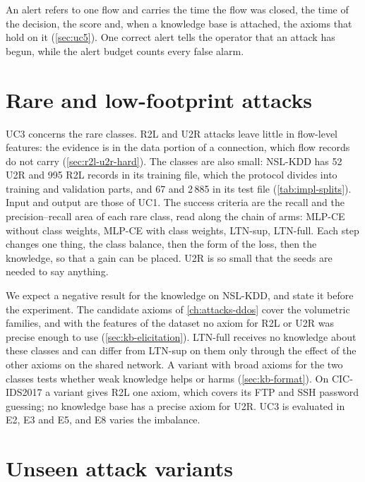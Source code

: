 An alert refers to one flow and carries the time the flow was closed, the time of
the decision, the score and, when a knowledge base is attached, the axioms that
hold on it (\cref{sec:uc5}). One correct alert tells the operator that an attack
has begun, while the alert budget counts every false alarm.

\section{Rare and low-footprint attacks}
\label{sec:uc3}

UC3 concerns the rare classes. R2L and U2R attacks leave little in flow-level features: the evidence is in the
data portion of a connection, which flow records do not carry
(\cref{sec:r2l-u2r-hard}). The classes are also small: NSL-KDD has 52 U2R and 995
R2L records in its training file, which the protocol divides into training and
validation parts, and 67 and 2\,885 in its test file (\cref{tab:impl-splits}).
Input and output are those of UC1. The success criteria are the recall and the
precision--recall area of each rare class, read along the chain of arms: MLP-CE
without class weights, MLP-CE with class weights, LTN-sup, LTN-full. Each step
changes one thing, the class balance, then the form of the loss, then the
knowledge, so that a gain can be placed. U2R is so small that the seeds are needed
to say anything.

We expect a negative result for the knowledge on NSL-KDD, and state it before the
experiment. The candidate axioms of \cref{ch:attacks-ddos} cover the volumetric
families, and with the features of the dataset no axiom for R2L or U2R was precise
enough to use (\cref{sec:kb-elicitation}). LTN-full receives no knowledge about
these classes and can differ from LTN-sup on them only through the effect of the
other axioms on the shared network. A variant with broad axioms for the two classes
tests whether weak knowledge helps or harms (\cref{sec:kb-format}). On CIC-IDS2017
a variant gives R2L one axiom, which covers its FTP and SSH password guessing; no knowledge
base has a precise axiom for U2R. UC3 is evaluated in E2, E3 and E5, and E8 varies the
imbalance.

\section{Unseen attack variants}
\label{sec:uc4}


